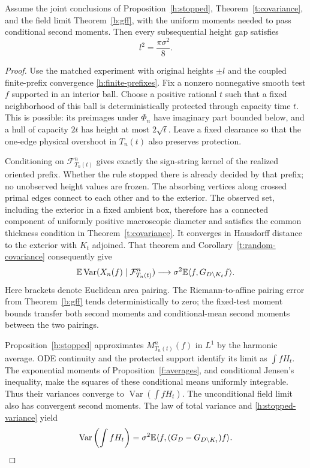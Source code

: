 \begin{proposition}\label{h:normalization}
Assume the joint conclusions of Proposition~\ref{h:stopped},
Theorem~\ref{t:covariance}, and the field limit
Theorem~\ref{b:gff}, with the uniform moments needed to pass conditional
second moments. Then every subsequential height gap satisfies
\[
 l^2=\frac{\pi\sigma^2}{8}.
\]
\end{proposition}
\begin{proof}
Use the matched experiment with original heights $\pm l$ and the coupled
finite-prefix convergence \eqref{h:finite-prefixes}. Fix a nonzero
nonnegative smooth test $f$ supported in an interior ball. Choose a
positive rational $t$ such that a fixed neighborhood of this ball is
deterministically protected through capacity time $t$. This is possible:
its preimages under $\Phi_n$ have imaginary part bounded below, and a
hull of capacity $2t$ has height at most $2\sqrt t$. Leave a fixed
clearance so that the one-edge physical overshoot in $T_n(t)$ also
preserves protection.

Conditioning on $\mathcal F^n_{T_n(t)}$ gives exactly the sign-string
kernel of the realized oriented prefix. Whether the rule stopped there
is already decided by that prefix; no unobserved height values are
frozen. The absorbing vertices along crossed primal edges connect to
each other and to the exterior. The observed set, including the exterior
in a fixed ambient box, therefore has a connected component of uniformly
positive macroscopic diameter and satisfies the common thickness
condition in Theorem~\ref{t:covariance}. It converges in Hausdorff distance
to the exterior with $K_t$ adjoined. That theorem and
Corollary~\ref{t:random-covariance} consequently give
\begin{equation}\label{h:stopped-variance}
 \mathbb E\operatorname{Var}(X_n(f)\mid\mathcal F^n_{T_n(t)})
 \longrightarrow\sigma^2\mathbb E\langle f,G_{D\setminus K_t}f\rangle.
\end{equation}
Here brackets denote Euclidean area pairing. The Riemann-to-affine
pairing error from Theorem~\ref{b:gff} tends deterministically to zero;
the fixed-test moment bounds transfer both second moments and
conditional-mean second moments between the two pairings.

Proposition~\ref{h:stopped} approximates $M^n_{T_n(t)}(f)$ in $L^1$
by the harmonic average. ODE continuity and the protected support
identify its limit as $\int fH_t$. The exponential moments of
Proposition~\ref{f:averages}, and conditional Jensen's inequality,
make the squares of these conditional means uniformly integrable.
Thus their variances converge to $\operatorname{Var}(\int fH_t)$.
The unconditional field limit also has convergent second moments.
The law of total variance and \eqref{h:stopped-variance} yield
\begin{equation}\label{h:total-variance}
 \operatorname{Var}\left(\int fH_t\right)
 =\sigma^2\mathbb E\langle f,(G_D-G_{D\setminus K_t})f\rangle.
\end{equation}


\end{proof}
